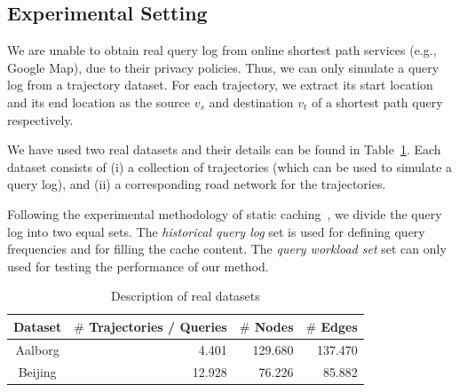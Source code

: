 



\subsection{Experimental Setting}
%
We are unable to obtain real query log from online shortest path services (e.g., Google Map), due to their privacy policies.
Thus, we can only simulate a query log from a trajectory dataset.
For each trajectory, we extract its start location and its end location as the
source $v_s$ and destination $v_t$ of a shortest path query respectively.

We have used two real datasets and their details can be found in Table~\ref{tab:datasetsize}.
Each dataset consists of (i) a collection of trajectories (which can be used to simulate a query log), and 
(ii) a corresponding road network for the trajectories.






Following the experimental methodology of static caching~\cite{Ozcan2011},
we divide the query log into two equal sets.
The {\em historical query log} set is used for defining query frequencies and
for filling the cache content.
The {\em query workload set} set can only used for testing the performance of our method.




\begin{table}
\center
\begin{tabular}{|c|r|r|r|}\hline
Dataset & $\#$ Trajectories / Queries & $\#$ Nodes & $\#$ Edges \\\hline
Aalborg & 4.401  & 129.680 & 137.470 \\\hline
Beijing & 12.928 & 76.226 & 85.882 \\\hline
\end{tabular}
\caption{Description of real datasets}
\label{tab:datasetsize}
\end{table}


